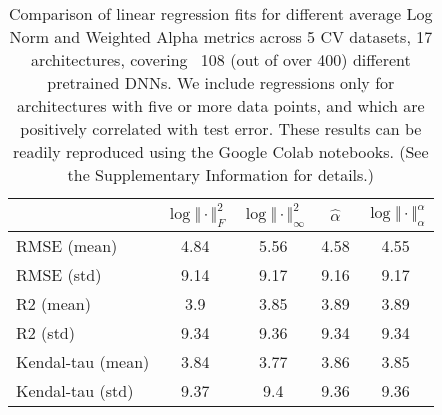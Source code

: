 
\begin{table}[t]
\small
\begin{center}
\begin{tabular}{|p{1.25in}|c|c|c|c|}
\hline
  & $\log\Vert\cdot\Vert^{2}_{F}$ & $\log\Vert\cdot\Vert^{2}_{\infty}$ & $\hat{\alpha}$ & $\log\Vert\cdot\Vert^{\alpha}_{\alpha}$ \\
\hline

RMSE (mean) & 4.84 & 5.56 & 4.58& 4.55 \\
RMSE (std) & 9.14 & 9.17 & 9.16& 9.17 \\
\hline
R2 (mean) & 3.9 & 3.85 & 3.89& 3.89 \\
R2 (std) & 9.34 & 9.36 & 9.34& 9.34 \\
\hline
Kendal-tau (mean) & 3.84 & 3.77 & 3.86& 3.85 \\
Kendal-tau (std) & 9.37 & 9.4 & 9.36& 9.36 \\
\hline

\hline
\end{tabular}
\end{center}
\caption{Comparison of linear regression fits for different average Log Norm and Weighted Alpha metrics across 5 CV datasets, 17 architectures, covering \
108 (out of over 400) different pretrained DNNs.
         We include regressions only for architectures with five or more data points, and which are positively correlated with test error.
         These results can be readily reproduced using the Google Colab notebooks.
         (See the Supplementary Information
         for details.)}
\label{table:results}
\end{table}


